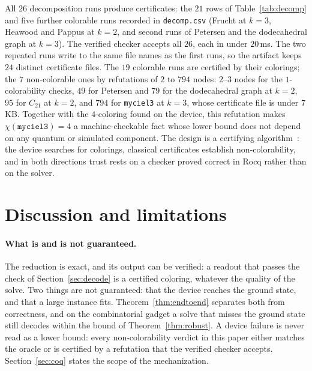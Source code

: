 \documentclass[a4paper,fleqn]{cas-sc}
\begin{document}
All $26$ decomposition runs produce certificates: the $21$ rows of
Table~\ref{tab:decomp} and five further colorable runs recorded in
\texttt{decomp.csv} (Frucht at $k=3$, Heawood and Pappus at $k=2$, and second runs of
Petersen and the dodecahedral graph at $k=3$). The verified checker accepts all $26$,
each in under $20$\,ms. The two repeated runs write to the same file names as the
first runs, so the artifact keeps $24$ distinct certificate files. The $19$ colorable runs are certified by their
colorings; the $7$ non-colorable ones by refutations of $2$ to $794$ nodes: $2$--$3$
nodes for the $1$-colorability checks, $49$ for Petersen and $79$ for the dodecahedral
graph at $k=2$, $95$ for $C_{21}$ at $k=2$, and $794$ for \texttt{myciel3} at $k=3$,
whose certificate file is under $7$\,KB. Together with the $4$-coloring found on the
device, this refutation makes $\chi(\texttt{myciel3})=4$ a machine-checkable fact
whose lower bound does not depend on any quantum or simulated component. The design
is a certifying algorithm~\cite{McConnell2011}: the device searches for colorings,
classical certificates establish non-colorability, and in both directions trust rests
on a checker proved correct in Rocq rather than on the solver.

\section{Discussion and limitations}
\label{sec:discussion}

\paragraph{What is and is not guaranteed.} The reduction is exact, and its output can
be verified: a readout that passes the check of Section~\ref{sec:decode} is a
certified coloring, whatever the quality of the solve. Two things are not guaranteed:
that the device reaches the ground state, and that a large instance fits.
Theorem~\ref{thm:endtoend} separates both from correctness, and on the combinatorial
gadget a solve that misses the ground state still decodes within the bound of
Theorem~\ref{thm:robust}. A device failure is never read as a lower bound: every
non-colorability verdict in this paper either matches the oracle or is certified by a
refutation that the verified checker accepts. Section~\ref{sec:coq} states the scope
of the mechanization.
\end{document}
